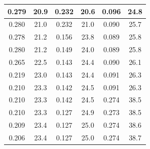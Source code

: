\begin{table}[]
\begin{tabular}{|cccccc}
\multicolumn{1}{|c|}{0.279}   & \multicolumn{1}{c|}{20.9}     & \multicolumn{1}{c|}{0.232}     & \multicolumn{1}{c|}{20.6}     & \multicolumn{1}{c|}{0.096}     & \multicolumn{1}{c|}{24.8}     \\ \hline
\multicolumn{1}{|c|}{0.280}   & \multicolumn{1}{c|}{21.0}     & \multicolumn{1}{c|}{0.232}     & \multicolumn{1}{c|}{21.0}     & \multicolumn{1}{c|}{0.090}     & \multicolumn{1}{c|}{25.7}     \\ \hline
\multicolumn{1}{|c|}{0.278}   & \multicolumn{1}{c|}{21.2}     & \multicolumn{1}{c|}{0.156}     & \multicolumn{1}{c|}{23.8}     & \multicolumn{1}{c|}{0.089}     & \multicolumn{1}{c|}{25.8}     \\ \hline
\multicolumn{1}{|c|}{0.280}   & \multicolumn{1}{c|}{21.2}     & \multicolumn{1}{c|}{0.149}     & \multicolumn{1}{c|}{24.0}     & \multicolumn{1}{c|}{0.089}     & \multicolumn{1}{c|}{25.8}     \\ \hline
\multicolumn{1}{|c|}{0.265}   & \multicolumn{1}{c|}{22.5}     & \multicolumn{1}{c|}{0.143}     & \multicolumn{1}{c|}{24.4}     & \multicolumn{1}{c|}{0.090}     & \multicolumn{1}{c|}{26.1}     \\ \hline
\multicolumn{1}{|c|}{0.219}   & \multicolumn{1}{c|}{23.0}     & \multicolumn{1}{c|}{0.143}     & \multicolumn{1}{c|}{24.4}     & \multicolumn{1}{c|}{0.091}     & \multicolumn{1}{c|}{26.3}     \\ \hline
\multicolumn{1}{|c|}{0.210}   & \multicolumn{1}{c|}{23.3}     & \multicolumn{1}{c|}{0.142}     & \multicolumn{1}{c|}{24.5}     & \multicolumn{1}{c|}{0.091}     & \multicolumn{1}{c|}{26.3}     \\ \hline
\multicolumn{1}{|c|}{0.210}   & \multicolumn{1}{c|}{23.3}     & \multicolumn{1}{c|}{0.142}     & \multicolumn{1}{c|}{24.5}     & \multicolumn{1}{c|}{0.274}     & \multicolumn{1}{c|}{38.5}     \\ \hline
\multicolumn{1}{|c|}{0.210}   & \multicolumn{1}{c|}{23.3}     & \multicolumn{1}{c|}{0.127}     & \multicolumn{1}{c|}{24.9}     & \multicolumn{1}{c|}{0.273}     & \multicolumn{1}{c|}{38.5}     \\ \hline
\multicolumn{1}{|c|}{0.209}   & \multicolumn{1}{c|}{23.4}     & \multicolumn{1}{c|}{0.127}     & \multicolumn{1}{c|}{25.0}     & \multicolumn{1}{c|}{0.274}     & \multicolumn{1}{c|}{38.6}     \\ \hline
\multicolumn{1}{|c|}{0.206}   & \multicolumn{1}{c|}{23.4}     & \multicolumn{1}{c|}{0.127}     & \multicolumn{1}{c|}{25.0}     & \multicolumn{1}{c|}{0.274}     & \multicolumn{1}{c|}{38.7}     \\ \hline

\end{tabular}
\end{table}
